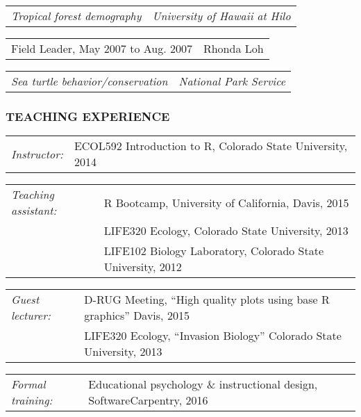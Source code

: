 \documentclass[11pt,english]{article}
\providecommand{\tabularnewline}{\\}
\begin{document}
\begin{tabular}{>{\raggedright}p{3.25in}>{\raggedleft}p{2.75in}}
\hspace{1.5em}\emph{Tropical forest demography} & \emph{University of Hawaii at Hilo}\tabularnewline
\end{tabular}
\vspace{-2ex}

\begin{tabular}{>{\raggedright}p{3in}>{\raggedleft}p{3in}}
Field Leader, May 2007 to Aug. 2007 & Rhonda Loh\tabularnewline
\end{tabular}

\begin{tabular}{>{\raggedright}p{3in}>{\raggedleft}p{3in}}
\hspace{1.5em}\emph{Sea turtle behavior/conservation} & \emph{National Park Service}
\end{tabular}


\subsubsection*{TEACHING EXPERIENCE}
\vspace{-0.5ex}

\begin{hangparas}{.25in}{1}

\begin{tabular}{>{\raggedright}p{1.26in}>{\raggedright}p{4.75in}}
\emph{Instructor:} & ECOL592 Introduction to R, Colorado State University, 2014
\end{tabular}

\begin{tabular}{>{\raggedright}p{1.26in}>{\raggedright}p{4.75in}}
\emph{Teaching assistant:} & R Bootcamp, University of California, Davis, 2015 \tabularnewline
& LIFE320 Ecology, Colorado State University, 2013 \tabularnewline 
& LIFE102 Biology Laboratory, Colorado State University, 2012 \tabularnewline
\end{tabular}

\begin{tabular}{>{\raggedright}p{1.26in}>{\raggedright}p{4.75in}}
\emph{Guest lecturer:} & D-RUG Meeting, ``High quality plots using base R graphics'' Davis, 2015 \tabularnewline
& LIFE320 Ecology, ``Invasion Biology'' Colorado State University, 2013
\end{tabular}

\begin{tabular}{>{\raggedright}p{1.26in}>{\raggedright}p{4.75in}}
\emph{Formal training:} & Educational psychology \& instructional design, SoftwareCarpentry, 2016
\end{tabular}

\end{hangparas}
\vspace{1ex}
\end{document}
